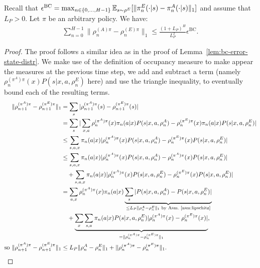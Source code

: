 \documentclass{article}
\begin{document}
\begin{lemma}
\label{lem:state-distribution-same-policy}
   Recall that $\epsilon^\mathrm{BC} = \max_{n\in\{0,\dots,H-1\}} \mathbb{E}_{s\sim\rho^E}[\|\pi_n^E(\cdot|s) - \pi_n^A(\cdot|s)\|_1]$ and assume that $L_P>0$. Let $\pi$ be an arbitrary policy. We have:
    \begin{align}
        \sum_{n=0}^{H-1}\|\rho_{n}^{(A)\pi} - \rho_{n}^{(E)\pi}\|_1
        \leq \frac{(1+L_P)^H}{L_P^2}\epsilon^\mathrm{BC}.
    \end{align}
\end{lemma}
\begin{proof}
The proof follows a similar idea as in the proof of Lemma~\ref{lem:bc-error-state-distr}. We make use of the definition of occupancy measure to make appear the measures at the previous time step, we add and subtract a term (namely $\rho_{n}^{(\pi^A)\pi}(x) P(s|x,a,\rho_n^{E})$ here) and use the triangle inequality, to eventually bound each of the resulting terms. 
\begin{align}
    \|\rho_{n+1}^{(\pi^A)\pi} - \rho_{n+1}^{(\pi^E)\pi}\|_1
    &= \sum_s |\rho_{n+1}^{(\pi^A)\pi}(s) - \rho_{n+1}^{(\pi^E)\pi}(s)|
    \\
    &= \sum_s |\sum_{x,a} \rho_{n}^{(\pi^A)\pi}(x) \pi_n(a|x) P(s|x,a,\rho_n^{A}) - \rho_{n}^{(\pi^E)\pi}(x) \pi_n(a|x) P(s|x,a,\rho_n^{E}) |
    \\
    &\leq \sum_{s,a,x} \pi_n(a|x) |\rho_{n}^{(\pi^A)\pi}(x) P(s|x,a,\rho_n^{A}) - \rho_{n}^{(\pi^E)\pi}(x)  P(s|x,a,\rho_n^{E})|
    \\
    &\leq \sum_{s,a,x} \pi_n(a|x) |\rho_{n}^{(\pi^A)\pi}(x) P(s|x,a,\rho_n^{A}) - \rho_{n}^{(\pi^A)\pi}(x) P(s|x,a,\rho_n^{E})|
    \\ &\quad 
    + \sum_{s,a,x} \pi_n(a|x) | \rho_{n}^{(\pi^A)\pi}(x) P(s|x,a,\rho_n^{E})- \rho_{n}^{(\pi^E)\pi}(x)  P(s|x,a,\rho_n^{E})|
    \\
    &= \sum_{a,x} \rho_{n}^{(\pi^A)\pi}(x)  \pi_n(a|x) \underbrace{\sum_s |P(s|x,a,\rho_n^{A}) - P(s|x,a,\rho_n^{E})|}_{\leq L_P \|\rho^{A}_n - \rho^E_n\|_1 \text{ by Asm.~\ref{asm:lipschitz}}}
    \\ &\quad
    + \underbrace{\sum_x \sum_{s,a} \pi_n(a|x) P(s|x,a,\rho_n^{E}) |\rho_{n}^{(\pi^A)\pi}(x) - \rho_{n}^{(\pi^E)\pi}(x)|}_{= \|\rho_{n}^{(\pi^A)\pi} - \rho_{n}^{(\pi^E)\pi}\|_1},
    \\
    \text{so }
      \|\rho_{n+1}^{(\pi^A)\pi} - \rho_{n+1}^{(\pi^E)\pi}\|_1 &\leq L_P \|\rho^{A}_n - \rho^E_n\|_1 + \|\rho_{n}^{(\pi^A)\pi} - \rho_{n}^{(\pi^E)\pi}\|_1. \label{eq:diff_pop_same_pol}
\end{align}


\end{proof}
\end{document}
